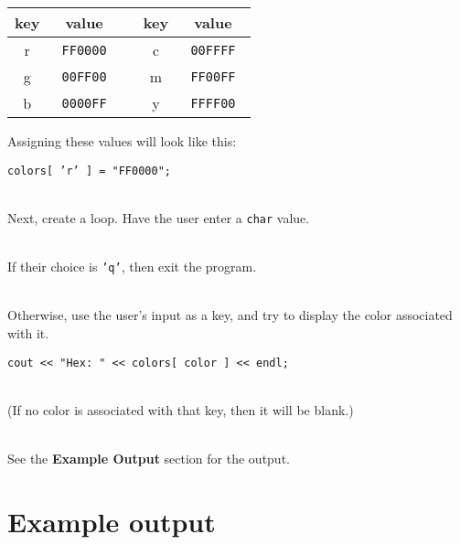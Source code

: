         \begin{center}
            \begin{tabular}{ | c | c | c | c | c | }
                \hline{}
                    \textbf{ key } &
                    \textbf{ value } & &
                    \textbf{ key } & 
                    \textbf{ value }

                \\ \hline
                
                r & \texttt{ FF0000 } & & c & \texttt{ 00FFFF }
                \\ \hline
                g & \texttt{ 00FF00 } & & m & \texttt{ FF00FF }
                \\ \hline
                b & \texttt{ 0000FF } & & y & \texttt{ FFFF00 }
                 \\ \hline
            \end{tabular}
        \end{center}

        Assigning these values will look like this:
        
        \begin{center}
            \texttt{colors[ 'r' ]       = "FF0000";}
        \end{center}

        ~\\ Next, create a loop. Have the user enter a \texttt{char} value.

        ~\\ If their choice is \texttt{'q'}, then exit the program.

        ~\\ Otherwise, use the user's input as a key, and try to display the color associated with it.

        \begin{center}
            \texttt{cout << "Hex: " << colors[ color ] << endl;}
        \end{center}

        ~\\ (If no color is associated with that key, then it will be blank.)

        ~\\ See the \textbf{Example Output} section for the output.
        

    \newpage
    \section{Example output}

